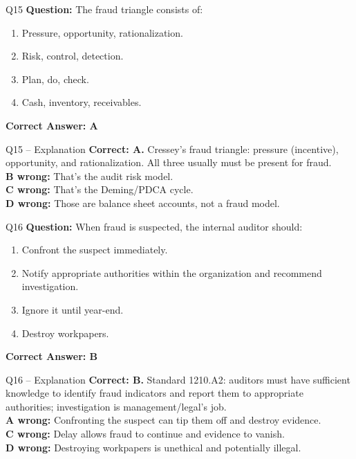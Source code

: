 \documentclass[aspectratio=169,10pt]{beamer}
\begin{document}
	\begin{frame}[t]{Q15}
		\small
		\textbf{Question:} The fraud triangle consists of:
		\begin{enumerate}[label=\Alph*.,itemsep=1pt,topsep=2pt]
			\item Pressure, opportunity, rationalization.
			\item Risk, control, detection.
			\item Plan, do, check.
			\item Cash, inventory, receivables.
		\end{enumerate}
		\vspace{4pt}
		\textbf{Correct Answer: A}
	\end{frame}
	
	\begin{frame}[t]{Q15 -- Explanation}
		\small
		\textbf{Correct: A.} Cressey's fraud triangle: pressure (incentive), opportunity, and rationalization. All three usually must be present for fraud. \\[4pt]
		\textbf{B wrong:} That's the audit risk model. \\[2pt]
		\textbf{C wrong:} That's the Deming/PDCA cycle. \\[2pt]
		\textbf{D wrong:} Those are balance sheet accounts, not a fraud model.
	\end{frame}
	
	\begin{frame}[t]{Q16}
		\small
		\textbf{Question:} When fraud is suspected, the internal auditor should:
		\begin{enumerate}[label=\Alph*.,itemsep=1pt,topsep=2pt]
			\item Confront the suspect immediately.
			\item Notify appropriate authorities within the organization and recommend investigation.
			\item Ignore it until year-end.
			\item Destroy workpapers.
		\end{enumerate}
		\vspace{4pt}
		\textbf{Correct Answer: B}
	\end{frame}
	
	\begin{frame}[t]{Q16 -- Explanation}
		\small
		\textbf{Correct: B.} Standard 1210.A2: auditors must have sufficient knowledge to identify fraud indicators and report them to appropriate authorities; investigation is management/legal's job. \\[4pt]
		\textbf{A wrong:} Confronting the suspect can tip them off and destroy evidence. \\[2pt]
		\textbf{C wrong:} Delay allows fraud to continue and evidence to vanish. \\[2pt]
		\textbf{D wrong:} Destroying workpapers is unethical and potentially illegal.
	\end{frame}
	
\end{document}
